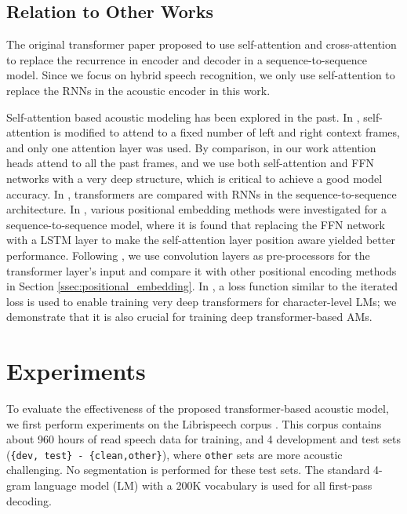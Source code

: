 \documentclass{article}
\begin{document}
\subsection{Relation to Other Works}
\label{sec:relation}
The original transformer paper \cite{vaswani2017attention} proposed to use self-attention and cross-attention to replace the recurrence in encoder and decoder in a sequence-to-sequence model. Since we focus on hybrid speech recognition, we only use self-attention to replace the RNNs in the acoustic encoder in this work.

Self-attention based acoustic modeling has been explored in the past. In \cite{povey2018time}, self-attention is modified to attend to a fixed number of left and right context frames, and only one attention layer was used. By comparison, in our work attention heads attend to all the past frames, and we use both self-attention and FFN networks with a very deep structure, which is critical to achieve a good model accuracy. In \cite{karita2019comparative}, transformers are compared with RNNs in the sequence-to-sequence architecture. In \cite{sperber2018self}, various positional embedding methods were investigated for a sequence-to-sequence model, where it is found that replacing the FFN network with a LSTM layer to make the self-attention layer position aware yielded better performance. Following \cite{mohamed2019transformers}, we use convolution layers as pre-processors for the transformer layer's input and compare it with other positional encoding methods in Section \ref{ssec:positional_embedding}. In \cite{al2019character}, a loss function similar to the iterated loss is used to enable training very deep transformers for character-level LMs; we demonstrate that it is also crucial for training deep transformer-based AMs.

\section{Experiments}
\label{sec:exp}
To evaluate the effectiveness of the proposed transformer-based acoustic model, we first perform experiments on the Librispeech corpus \cite{panayotov2015librispeech}. This corpus contains about 960 hours of read speech data for training, and 4 development and test sets (\texttt{\{dev, test\} - \{clean,other\}}), where \texttt{other} sets are more acoustic challenging. No segmentation is performed for these test sets. The standard 4-gram language model (LM) with a 200K vocabulary is used for all first-pass decoding. 
\end{document}
